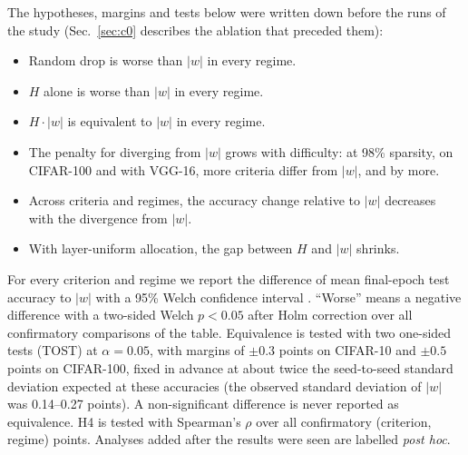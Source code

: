 The hypotheses, margins and tests below were written down before the runs of the study (Sec.~\ref{sec:c0} describes the ablation that preceded them):
\begin{itemize}
    \item[H0] Random drop is worse than $|w|$ in every regime.
    \item[H1] $H$ alone is worse than $|w|$ in every regime.
    \item[H2] $H\cdot|w|$ is equivalent to $|w|$ in every regime.
    \item[H3] The penalty for diverging from $|w|$ grows with difficulty: at 98\% sparsity, on CIFAR-100 and with VGG-16, more criteria differ from $|w|$, and by more.
    \item[H4] Across criteria and regimes, the accuracy change relative to $|w|$ decreases with the divergence from $|w|$.
    \item[H5] With layer-uniform allocation, the gap between $H$ and $|w|$ shrinks.
\end{itemize}
For every criterion and regime we report the difference of mean final-epoch test accuracy to $|w|$ with a 95\% Welch confidence interval \cite{welch1947generalization}. ``Worse'' means a negative difference with a two-sided Welch $p<0.05$ after Holm correction \cite{holm1979simple} over all confirmatory comparisons of the table. Equivalence is tested with two one-sided tests (TOST) \cite{schuirmann1987comparison,lakens2017equivalence} at $\alpha=0.05$, with margins of $\pm0.3$ points on CIFAR-10 and $\pm0.5$ points on CIFAR-100, fixed in advance at about twice the seed-to-seed standard deviation expected at these accuracies (the observed standard deviation of $|w|$ was 0.14--0.27 points). A non-significant difference is never reported as equivalence. H4 is tested with Spearman's $\rho$ over all confirmatory (criterion, regime) points. Analyses added after the results were seen are labelled \emph{post hoc}.
